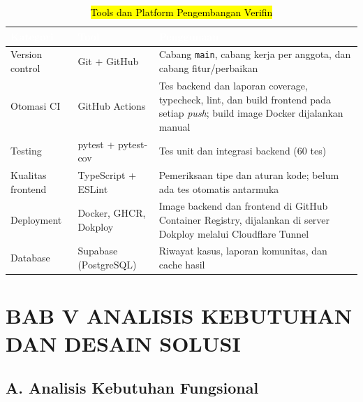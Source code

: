\documentclass[12pt,a4paper]{article}
\newcommand{\revisi}[1]{\hl{#1}}
\newcommand{\thead}[1]{\textcolor{white}{\textbf{#1}}}
\begin{document}
\begin{table}[htbp]
\centering
\caption{\revisi{Tools dan Platform Pengembangan Verifin}}
\label{tab:tools-platform}
\small
\begin{tabularx}{\linewidth}{|L{3.0cm}|L{3.6cm}|Y|}
\hline
{}\thead{Kategori} & \thead{Tool} & \thead{Penggunaan} \\
\hline
{}Version control & Git + GitHub & Cabang \texttt{main}, cabang kerja per anggota, dan cabang fitur/perbaikan \\ \hline
{}Otomasi CI & GitHub Actions & Tes backend dan laporan coverage, typecheck, lint, dan build frontend pada setiap \textit{push}; build image Docker dijalankan manual \\ \hline
{}Testing & pytest + pytest-cov & Tes unit dan integrasi backend (60 tes) \\ \hline
{}Kualitas frontend & TypeScript + ESLint & Pemeriksaan tipe dan aturan kode; belum ada tes otomatis antarmuka \\ \hline
{}Deployment & Docker, GHCR, Dokploy & Image backend dan frontend di GitHub Container Registry, dijalankan di server Dokploy melalui Cloudflare Tunnel \\ \hline
{}Database & Supabase (PostgreSQL) & Riwayat kasus, laporan komunitas, dan cache hasil \\ \hline
\end{tabularx}
\end{table}


\section*{BAB V ANALISIS KEBUTUHAN DAN DESAIN SOLUSI}

\subsection*{A. Analisis Kebutuhan Fungsional}
\end{document}
